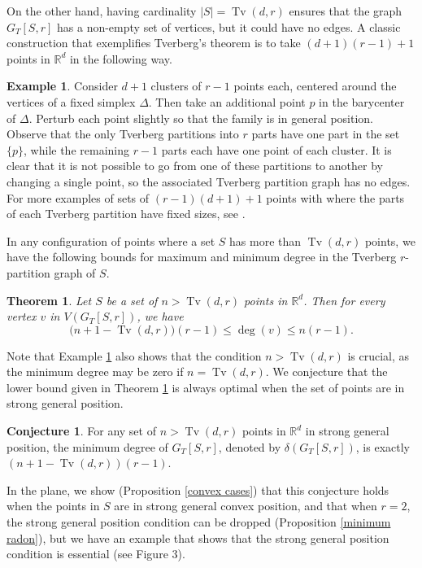 \documentclass[11pt,a4paper]{article}
\theoremstyle{plain}
\newtheorem{theorem}{Theorem}[section]
\theoremstyle{definition}
\newtheorem{conjecture}{Conjecture}
\newtheorem{example}{Example}
\newcommand{\rr}{\mathds{R}}
\newcommand{\tv}{\operatorname{Tv}}
\begin{document}
 On the other hand, having cardinality $|S|= \tv(d,r)$ ensures that the graph $G_T[S,r]$ has a non-empty set of vertices, but it could have no edges.  A classic construction that exemplifies Tverberg's theorem is to take $(d+1)(r-1)+1$ points in $\rr^d$ in the following way.

 \begin{example}\label{eg:1}
 Consider $d+1$ clusters of $r-1$ points each, centered around the vertices of a fixed simplex $\Delta$. Then take an additional point $p$ in the barycenter of $\Delta$. Perturb each point slightly so that the family is in general position.  Observe that the only Tverberg partitions into $r$ parts have one part in the set $\{p\}$, while the remaining  $r-1$ parts each have one point of each cluster.  It is clear that it is not possible to go from one of these partitions to another by changing a single point, so the associated Tverberg partition graph has no edges.  For more examples of sets of $(r-1)(d+1)+1$ points with where the parts of each Tverberg partition have fixed sizes, see \cite{White2017}.
\end{example}


In any configuration of points where a set $S$ has more than $\tv(d,r)$ points, we have the following bounds for maximum and minimum degree in the Tverberg $r$-partition graph of $S$.

 \begin{theorem}\label{degree}
Let $S$ be a set of $n> \tv(d,r)$ points in $\rr^d$. Then for every vertex $v$ in $V(G_T[S,r])$, we have
\[
\Big(n+1 - \tv(d,r) \Big)(r-1)\leq \operatorname{deg}(v) \leq n(r-1).
\]  
\end{theorem}

Note that Example \ref{eg:1} also shows that the condition $n>\tv(d,r)$ is crucial, as the minimum degree may be zero if $n=\tv(d,r)$.  We conjecture that the lower bound given in Theorem \ref{degree} is always optimal when the set of points are in strong general position.  

\begin{conjecture}\label{minimum degree}
For any set of $n > \tv(d,r)$ points in $\rr^d$ in strong general position, the minimum degree of $G_T[S,r]$, denoted by $\delta(G_T[S,r])$, is exactly $(n+1 - \tv(d,r) )(r-1)$.  
\end{conjecture}

In the plane, we show (Proposition \ref{convex cases}) that this conjecture holds when the points in $S$ are in strong general convex position, and that when $r=2$, the strong general position condition can be dropped (Proposition \ref{minimum radon}), but we have an example that shows that the strong general position condition is essential (see Figure 3).  
\end{document}
